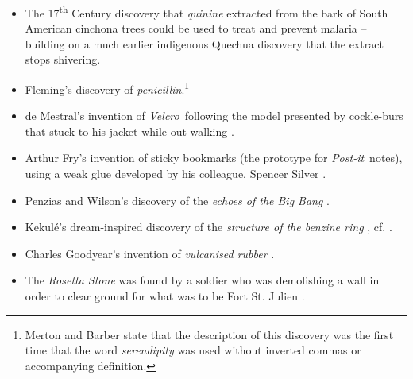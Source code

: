 \begin{itemize}
\item The 17\textsuperscript{th} Century discovery that \emph{quinine} extracted from
  the bark of South American cinchona trees could be used to treat and
  prevent malaria -- building on a much earlier indigenous Quechua
  discovery that the extract stops shivering.
\item Fleming's discovery of {\em penicillin}.\footnote{Merton and
  Barber \citeyear{merton} state that the description of this discovery
  was the first time that the word \emph{serendipity} was used without
  inverted commas or accompanying definition.}
\item de Mestral's invention of {\em Velcro}\texttrademark\ following
  the model presented by cockle-burs that stuck to his jacket while
  out walking \cite[pp 220-222]{roberts}.
\item Arthur Fry's invention of sticky bookmarks (the prototype for
  {\em Post-it}\texttrademark\ notes), using a weak glue developed by
  his colleague, Spencer Silver \cite[p. 224]{roberts}.
\item Penzias and Wilson's discovery of the {\em echoes of the Big
  Bang} \cite{singh2004big}.
\item Kekul\'e's dream-inspired discovery of the {\em structure of the
  benzine ring} \cite[p. 21]{benfey}, cf. \cite[p. 77]{roberts}.
\item Charles Goodyear's invention of {\em vulcanised rubber}
  \cite{goodyear1855gum}.
\item The {\em Rosetta Stone} was found by a soldier who was
  demolishing a wall in order to clear ground for what was to be Fort
  St. Julien \cite[pp. 109 - 111]{roberts}.
\end{itemize}

